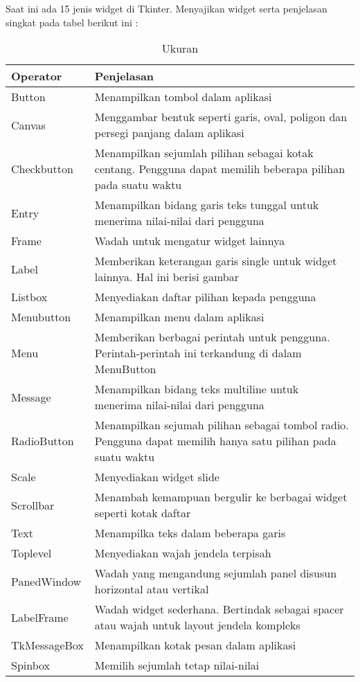 \hspace*{0.5in} Saat ini ada 15 jenis widget di Tkinter. Menyajikan widget serta penjelasan singkat pada tabel berikut ini : 
\vspace{100pt}





\begin{table}[h]
	\caption{Ukuran}
		\begin{center}
		\begin{tabular}{|l|l|}
			\hline
			Operator & Penjelasan \\
			\hline
			Button & Menampilkan tombol dalam aplikasi\\
			Canvas & Menggambar bentuk seperti garis, oval, 
			poligon dan persegi panjang dalam aplikasi\\
			Checkbutton & Menampilkan sejumlah pilihan 
			sebagai kotak centang. Pengguna dapat memilih beberapa pilihan pada suatu waktu\\
			Entry & Menampilkan bidang garis teks tunggal untuk menerima nilai-nilai dari pengguna\\
			Frame & Wadah untuk mengatur widget lainnya\\
			Label & Memberikan keterangan garis single untuk widget lainnya. Hal ini berisi gambar\\
			Listbox & Menyediakan daftar pilihan kepada pengguna\\
			Menubutton & Menampilkan menu dalam aplikasi\\
			Menu & Memberikan berbagai perintah untuk pengguna. Perintah-perintah ini terkandung di dalam MenuButton\\
			Message & Menampilkan bidang teks multiline untuk menerima nilai-nilai dari pengguna\\
			RadioButton & Menampilkan sejumah pilihan sebagai tombol radio. Pengguna dapat memilih hanya satu pilihan pada suatu waktu\\
			Scale & Menyediakan widget slide\\
			Scrollbar & Menambah kemampuan bergulir ke berbagai widget seperti kotak daftar\\
			Text & Menampilka teks dalam beberapa garis\\
			Toplevel & Menyediakan wajah jendela terpisah\\
			PanedWindow & Wadah yang mengandung sejumlah panel disusun horizontal atau vertikal\\
			LabelFrame & Wadah widget sederhana. Bertindak sebagai spacer atau wajah untuk layout jendela kompleks\\
			TkMessageBox & Menampilkan kotak pesan dalam aplikasi\\
			Spinbox & Memilih sejumlah tetap nilai-nilai\\
		\hline
		\end{tabular}
		\end{center}
\end{table}

